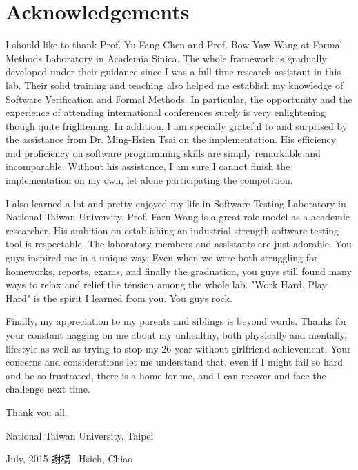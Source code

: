 
\chapter{Acknowledgements}
I should like to thank Prof. Yu-Fang Chen and Prof. Bow-Yaw Wang at Formal
Methods Laboratory in Academia Sinica.
The whole framework is gradually developed under their guidance since I was a
full-time research assistant in this lab.
Their solid training and teaching also helped me establish my knowledge of
Software Verification and Formal Methods.
In particular, the opportunity and the experience of attending international
conferences surely is very enlightening though quite frightening.
In addition, I am specially grateful to and surprised by the assistance from
Dr. Ming-Hsien Tsai on the implementation.
His efficiency and proficiency on software programming skills are simply
remarkable and incomparable.
Without his assistance, I am sure I cannot finish the implementation on my own,
let alone participating the competition.

I also learned a lot and pretty enjoyed my life in Software Testing Laboratory
in National Taiwan University.
Prof. Farn Wang is a great role model as a academic researcher.
His ambition on establishing an industrial strength software testing tool is
respectable.
The laboratory members and assistants are just adorable.
You guys inspired me in a unique way.
Even when we were both struggling for homeworks, reports, exams, and finally
the graduation, you guys still found many ways to relax and relief the tension
among the whole lab.
"Work Hard, Play Hard" is the spirit I learned from you.
You guys rock.

Finally, my appreciation to my parents and siblings is beyond words.
Thanks for your constant nagging on me about my unhealthy, both physically and
mentally, lifestyle as well as trying to stop my 26-year-without-girlfriend
achievement.
Your concerns and considerations let me understand that,
even if I might fail so hard and be so frustrated,
there is a home for me, and I can recover and face the challenge next time.

\vspace{8mm}

\noindent
Thank you all.

\vspace{8mm}

\noindent
National Taiwan University, Taipei

\noindent
July, 2015 \hfill 謝橋 \ Hsieh, Chiao

